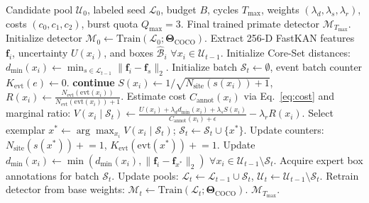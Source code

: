\documentclass[conference]{IEEEtran}
\begin{document}
\begin{algorithm}[t]
\caption{AE-Primate Cost-Aware Active Learning}
\label{alg:aeprimate}
\begin{algorithmic}[1]
\footnotesize
\REQUIRE Candidate pool $\mathcal{U}_0$, labeled seed $\mathcal{L}_0$, budget $B$, cycles $T_{\text{max}}$, weights $(\lambda_d, \lambda_s, \lambda_r)$, costs $(c_0, c_1, c_2)$, burst quota $Q_{\max} = 3$.
\ENSURE Final trained primate detector $\mathcal{M}_{T_{\text{max}}}$.
\STATE Initialize detector $\mathcal{M}_0 \leftarrow \text{Train}(\mathcal{L}_0; \mathbf{\Theta}_{\text{COCO}})$.
  \STATE Extract 256-D FastKAN features $\mathbf{f}_i$, uncertainty $U(x_i)$, and boxes $\hat{\mathcal{B}}_i$ $\forall x_i \in \mathcal{U}_{t-1}$.
  \STATE Initialize Core-Set distances: $d_{\min}(x_i) \leftarrow \min_{s \in \mathcal{L}_{t-1}} \|\mathbf{f}_i - \mathbf{f}_s\|_2$.
  \STATE Initialize batch $\mathcal{S}_t \leftarrow \emptyset$, event batch counter $K_{\text{evt}}(e) \leftarrow 0$.
       \STATE \textbf{continue}  \ENDIF
      \STATE $S(x_i) \leftarrow 1 / \sqrt{N_{\text{site}}(s(x_i)) + 1}$, $R(x_i) \leftarrow \frac{N_{\text{evt}}(\text{evt}(x_i))}{N_{\text{evt}}(\text{evt}(x_i)) + 1}$.
      \STATE Estimate cost $C_{\text{annot}}(x_i)$ via Eq.~\ref{eq:cost} and marginal ratio:
      \STATE $V(x_i \mid \mathcal{S}_t) \leftarrow \frac{U(x_i) + \lambda_d d_{\min}(x_i) + \lambda_s S(x_i)}{C_{\text{annot}}(x_i) + \epsilon} - \lambda_r R(x_i)$.
    \ENDFOR
    \STATE Select exemplar $x^* \leftarrow \arg\max_{x_i} V(x_i \mid \mathcal{S}_t)$; $\mathcal{S}_t \leftarrow \mathcal{S}_t \cup \{x^*\}$.
    \STATE Update counters: $N_{\text{site}}(s(x^*)) \mathrel{+}= 1$, $K_{\text{evt}}(\text{evt}(x^*)) \mathrel{+}= 1$.
    \STATE Update $d_{\min}(x_i) \leftarrow \min(d_{\min}(x_i), \|\mathbf{f}_i - \mathbf{f}_{x^*}\|_2)$ $\forall x_i \in \mathcal{U}_{t-1} \setminus \mathcal{S}_t$.
  \ENDWHILE
  \STATE Acquire expert box annotations for batch $\mathcal{S}_t$.
  \STATE Update pools: $\mathcal{L}_t \leftarrow \mathcal{L}_{t-1} \cup \mathcal{S}_t$, $\mathcal{U}_t \leftarrow \mathcal{U}_{t-1} \setminus \mathcal{S}_t$.
  \STATE Retrain detector from base weights: $\mathcal{M}_t \leftarrow \text{Train}(\mathcal{L}_t; \mathbf{\Theta}_{\text{COCO}})$.
\ENDFOR
\RETURN $\mathcal{M}_{T_{\text{max}}}$.
\end{algorithmic}
\end{algorithm}
\end{document}
